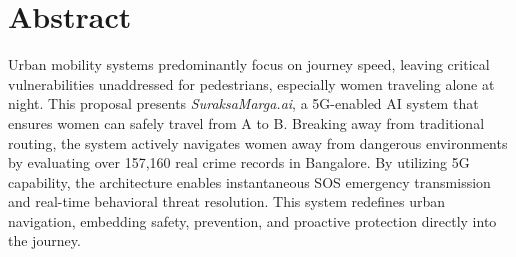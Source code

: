\section*{Abstract}
Urban mobility systems predominantly focus on journey speed, leaving critical vulnerabilities unaddressed for pedestrians, especially women traveling alone at night. This proposal presents \textit{SuraksaMarga.ai}, a 5G-enabled AI system that ensures women can safely travel from A to B. Breaking away from traditional routing, the system actively navigates women away from dangerous environments by evaluating over 157,160 real crime records in Bangalore. By utilizing 5G capability, the architecture enables instantaneous SOS emergency transmission and real-time behavioral threat resolution. This system redefines urban navigation, embedding safety, prevention, and proactive protection directly into the journey.
